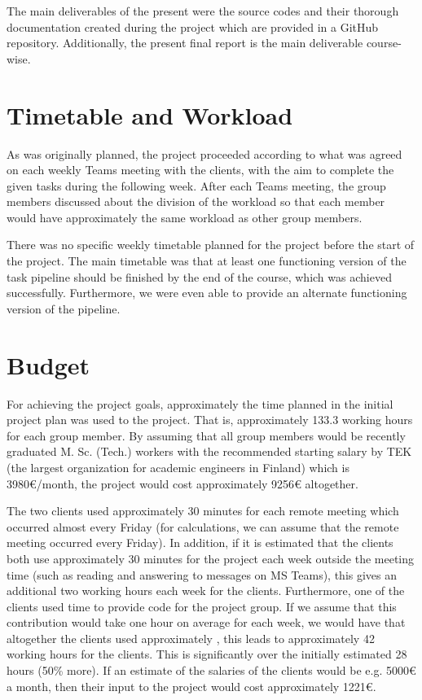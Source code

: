 The main deliverables of the present were the source codes and their thorough documentation created during the project which are provided in a GitHub repository. Additionally, the present final report is the main deliverable course-wise.

\section{Timetable and Workload}

As was originally planned, the project proceeded according to what was agreed on each weekly Teams meeting with the clients, with the aim to complete the given tasks during the following week. After each Teams meeting, the group members discussed about the division of the workload so that each member would have approximately the same workload as other group members.

There was no specific weekly timetable planned for the project before the start of the project. The main timetable was that at least one functioning version of the task pipeline should be finished by the end of the course, which was achieved successfully. Furthermore, we were even able to provide an alternate functioning version of the pipeline.

\section{Budget}

For achieving the project goals, approximately the time planned in the initial project plan was used to the project. That is, approximately 133.3 working hours for each group member. By assuming that all group members would be recently graduated M. Sc. (Tech.) workers with the recommended starting salary by TEK (the largest organization for academic engineers in Finland) which is 3980{\euro}/month, the project would cost approximately 9256{\euro} altogether.

The two clients used approximately 30 minutes for each remote meeting which occurred almost every Friday (for calculations, we can assume that the remote meeting occurred every Friday). In addition, if it is estimated that the clients both use approximately 30 minutes for the project each week outside the meeting time (such as reading and answering to messages on MS Teams), this gives an additional two working hours each week for the clients. Furthermore, one of the clients used time to provide code for the project group. If we assume that this contribution would take one hour on average for each week, we would have that altogether the clients used approximately , this leads to approximately 42 working hours for the clients. This is significantly over the initially estimated 28 hours (50\% more). If an estimate of the salaries of the clients would be e.g. 5000{\euro} a month, then their input to the project would cost approximately 1221{\euro}.


